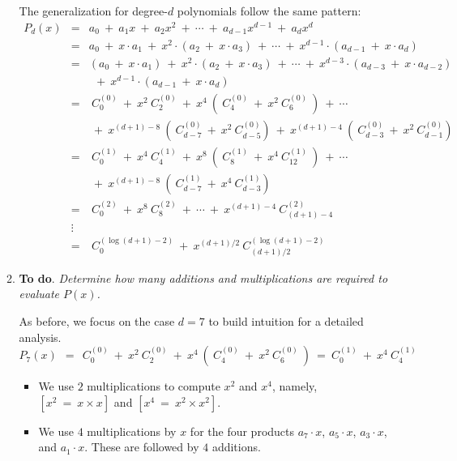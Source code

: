 \begin{itemize}
\begin{enumerate}
\smallskip

The generalization for degree-$d$ polynomials follow the same pattern:
\begin{eqnarray*}
P_d(x) & = & a_0 \ + \ a_1 x \ + \ a_2 x^2 \ +  \ \cdots \ + \ a_{d-1} x^{d-1} \ + \ a_{d} x^{d} \\
           & = & a_0 \ + \ x \cdot a_1 \ + \ x^2 \cdot (a_2  \ + \ x \cdot a_3) \  +  \ \cdots \ + \ x^{d-1} \cdot (a_{d-1}  \ + \ x \cdot a_{d})\\
           & = & (a_0 \ + \ x \cdot a_1) \ + \ x^2 \cdot (a_2  \ + \ x \cdot a_3) \ + \ \cdots \ + \ x^{d-3} \cdot (a_{d-3} \ + \ x \cdot a_{d-2}) \\
           & & \ \ + \ x^{d-1} \cdot (a_{d-1}  \ + \ x \cdot a_{d}) \\
           & = & \ C_{0}^{(0)} \ + \ x^2 \ C_2^{(0)} \ + \ x^4 \ ( \ C_4^{(0)} \ + \ x^2 \ C_{6}^{(0)} \ )  \ + \ \cdots \\
           &  & \ + \ x^{(d+1)-8} \ (\ C_{d-7}^{(0)} \ + \ x^2 \ C_{d-5}^{(0)}) \ + \ x^{(d+1)-4} \ ( \ C_{d-3}^{(0)} \ + \ x^2 \ C_{d-1}^{(0)} ) \\
          & = & \ C_{0}^{(1)} \ + \ x^4 \ C_4^{(1)} \ + \ x^8 \ ( \ C_8^{(1)} \ + \ x^4 \ C_{12}^{(1)} \ )  \ + \ \cdots \\
          &  &  \ + \ x^{(d+1)-8} \ ( \ C_{d-7}^{(1)} \ + \ x^4 \ C_{d-3}^{(1)} ) \\
         & = & \ C_{0}^{(2)} \ + \ x^8 \ C_8^{(2)}  \ + \ \cdots \ + \ x^{(d+1)-4} \ C_{(d+1)-4}^{(2)} \\
         & \vdots &  \\
         & = & \ C_0^{(\log (d+1)-2)} \ + \ x^{(d+1)/2} \ C_{(d+1)/2}^{(\log (d+1)-2)} 
\end{eqnarray*}

\medskip
\item
{\bf To do}.
{\em Determine how many additions and multiplications are required to evaluate $P(x)$.}

\smallskip

As before, we focus on the case $d=7$ to build intuition for a detailed analysis. 
\[
P_7(x) \ \ = \ \ C_{0}^{(0)} \ + \ x^2 \ C_2^{(0)} \ + 
\ x^4 \ ( \ C_4^{(0)} \ + \ x^2 \ C_6^{(0)} \ )
\ = \ C_0^{(1)} \ + \ x^4 \ C_4^{(1)} 
\]
\begin{itemize}
\item
We use $2$ multiplications to compute $x^2$ and $x^4$, namely,
$[x^2 \ = \ x \times x]$ and $[x^4 \ = \ x^2 \times x^2]$.

\medskip\item
We use $4$ multiplications by $x$ for the four products $a_7 \cdot x$,  $a_5 \cdot x$, $a_3 \cdot x$, and $a_1 \cdot x$.  These are followed by $4$ additions.


\end{itemize}
\end{enumerate}
\end{itemize}
